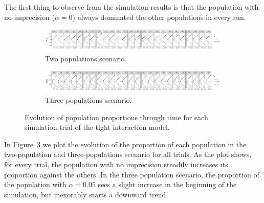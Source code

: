 \documentclass[a4paper]{article}
\begin{document}
The first thing to observe from the simulation results is that the population with no imprecision ($\alpha = 0$) always dominated the other populations in every run.
\begin{figure}
  \centering
  \begin{subfigure}[]{\textwidth}
    \includegraphics[width=\textwidth]{simulation/results/round-3/plots/proportion-cases-0-005-strong.png}
    \caption{Two populations scenario.}
    \label{fig:proportion-cases-two-tight-interaction}
  \end{subfigure}
  \hfill
  \begin{subfigure}[]{\textwidth}
    \includegraphics[width=\textwidth]{simulation/results/round-3/plots/proportion-cases-0-005-01-strong.png}
    \caption{Three populations scenario.}
    \label{fig:proportion-cases-three-tight-interaction}
  \end{subfigure}
  \caption{Evolution of population proportions through time for each simulation trial of the tight interaction model.}
  \label{fig:proportion-cases-tight-interaction}
\end{figure}
In Figure~\ref{fig:proportion-cases-tight-interaction} we plot the evolution of the proportion of each population in the two-population and three-populations scenario for all trials.
As the plot shows, for every trial, the population with no imprecision steadily increases its proportion against the others.
In the three population scenario, the proportion of the population with $\alpha = 0.05$ sees a slight increase in the beginning of the simulation, but inexorably starts a downward trend.
\end{document}
